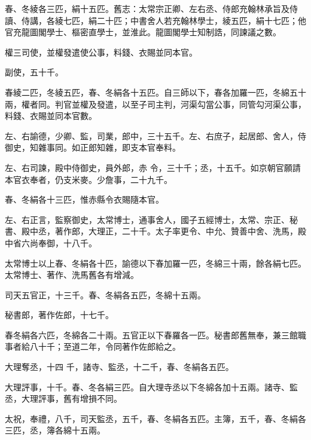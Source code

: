 \begin{pinyinscope}
 春、冬綾各三匹，絹十五匹。舊志：太常宗正卿、左右丞、侍郎充翰林承旨及侍讀、侍講，各綾七匹，絹二十匹；中書舍人若充翰林學士，綾五匹，絹十七匹；他官充龍圖閣學士、樞密直學士，並淮此。龍圖閣學士知制誥，同諫議之數。



 權三司使，並權發遣使公事，料錢、衣賜並同本官。



 副使，五十千。



 春綾二匹，冬綾五匹，春、冬絹各十五匹。自三師以下，春各加羅一匹，冬綿五十兩，權者同。判官並權及發遣，以至子司主判，河渠勾當公事，同管勾河渠公事，料錢、衣賜並同本官數。



 左、右諭德，少卿、監，司業，郎中，三十五千。左、右庶子，起居郎、舍人，侍御史，知雜事同。如正郎知雜，即支本官奉料。



 左、右司諫，殿中侍御史，員外郎，赤
 令，三十千；丞，十五千。如京朝官願請本官衣奉者，仍支米麥。少詹事，二十九千。



 春、冬絹各十三匹，惟赤縣令衣賜隨本官。



 左、右正言，監察御史，太常博士，通事舍人，國子五經博士，太常、宗正、秘書、殿中丞，著作郎，大理正，二十千。太子率更令、中允、贊善中舍、洗馬，殿中省六尚奉御，十八千。



 太常博士以上春、冬絹各十匹，諭德以下春加羅一匹，冬綿三十兩，餘各絹七匹。太常博士、著作、洗馬舊各有增減。



 司天五官正，十三千。春、冬絹各五匹，冬綿十五兩。



 秘書郎，著作佐郎，十七千。



 春冬絹各六匹，冬綿各二十兩。五官正以下春羅各一匹。秘書郎舊無奉，兼三館職事者給八十千；至道二年，令同著作佐郎給之。



 大理奪丞，十四
 千，諸寺、監丞，十二千，春、冬絹各五匹。



 大理評事，十千。春、冬各絹三匹。自大理寺丞以下冬綿各加十五兩。諸寺、監丞，大理評事，舊有增損不同。



 太祝，奉禮，八千，司天監丞，五千，春、冬絹各五匹。主簿，五千，春、冬絹各三匹，丞，簿各綿十五兩。




\end{pinyinscope}
